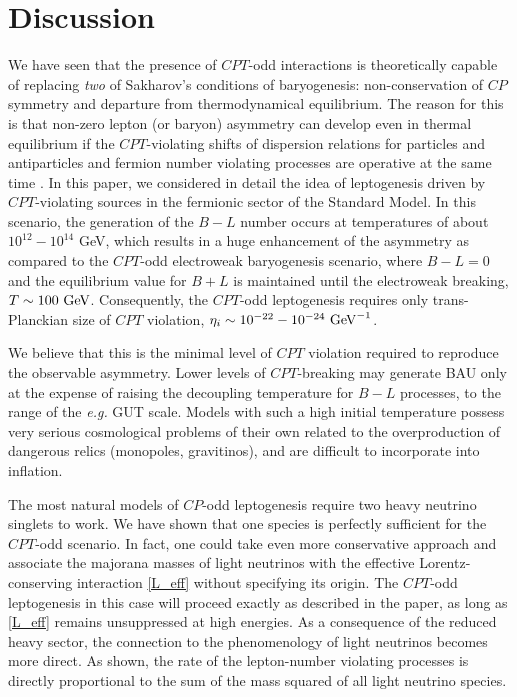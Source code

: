 \documentclass[12pt]{revtex4}
\newcommand{\GeV}{{\rm GeV}}
\begin{document}
\section{Discussion}

	We have seen that the presence of $CPT$-odd interactions is theoretically capable
	of replacing \emph{two} of Sakharov's conditions of baryogenesis: non-conservation 
	of $CP$ symmetry and departure from thermodynamical equilibrium.
	The reason for this is that non-zero lepton (or baryon) asymmetry can develop even in 
thermal equilibrium if  the $CPT$-violating shifts of dispersion relations for particles 
and antiparticles and fermion number violating processes are operative at the 
same time \cite{Dolgov:1981hv}. In this paper, we considered in detail the idea of 
leptogenesis driven by $CPT$-violating sources in the fermionic sector of the 
Standard Model. In this scenario, the generation of the $B-L$ number 
occurs at temperatures of about $10^{12}-10^{14}$ GeV, which results in a huge enhancement of the 
asymmetry as compared to the $CPT$-odd electroweak baryogenesis scenario, where $B-L=0$ and 
the equilibrium value for $B+L$ is maintained until the electroweak breaking, 
	$T\sim 100~\GeV$. 
Consequently, the $CPT$-odd leptogenesis requires only trans-Planckian size of 
$CPT$ violation, $\eta_i \sim 10^{-22}-10^{-24}~\GeV^{-1}$. 

We believe that this is the minimal level 
of $CPT$ violation required to reproduce the observable asymmetry. Lower levels of $CPT$-breaking 
may generate BAU 
only at the expense of  raising the decoupling temperature for $B-L$ processes, to the range of 
the {\em e.g.} GUT scale. Models with such a high initial temperature possess very serious cosmological 
problems of their own related to the overproduction of dangerous relics (monopoles, gravitinos), and 
are difficult to incorporate into inflation. 



   The most natural models of $CP$-odd leptogenesis require two heavy neutrino singlets
   to work. We have shown that one species is perfectly sufficient for the $CPT$-odd scenario. 
   In fact, one could take even more conservative approach and associate the majorana 
   masses of light neutrinos with the effective Lorentz-conserving interaction \eqref{L_eff} without 
   specifying its origin. The $CPT$-odd leptogenesis in this case will proceed exactly as 
described in the paper, as long as \eqref{L_eff} remains unsuppressed at high energies. 
As a consequence of  the reduced heavy sector, the 
connection to the phenomenology of light neutrinos becomes more 
direct. As shown, the rate of the lepton-number violating processes is 
directly proportional to the sum of the mass squared of all light neutrino species. 
	
\end{document}
